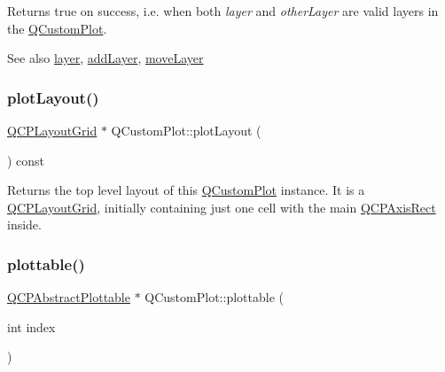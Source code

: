Returns true on success, i.\+e. when both {\itshape layer} and {\itshape other\+Layer} are valid layers in the \hyperlink{class_q_custom_plot}{Q\+Custom\+Plot}.

\begin{DoxySeeAlso}{See also}
\hyperlink{class_q_custom_plot_a0a96244e7773b242ef23c32b7bdfb159}{layer}, \hyperlink{class_q_custom_plot_ad5255393df078448bb6ac83fa5db5f52}{add\+Layer}, \hyperlink{class_q_custom_plot_ae896140beff19424e9e9e02d6e331104}{move\+Layer} 
\end{DoxySeeAlso}
\mbox{\label{class_q_custom_plot_af1a1f1f571237deb7c2bd34a5e9f018f}} 
\subsubsection{\texorpdfstring{plot\+Layout()}{plotLayout()}}
{\footnotesize\ttfamily \hyperlink{class_q_c_p_layout_grid}{Q\+C\+P\+Layout\+Grid} $\ast$ Q\+Custom\+Plot\+::plot\+Layout (\begin{DoxyParamCaption}{ }\end{DoxyParamCaption}) const\hspace{0.3cm}{\ttfamily [inline]}}

Returns the top level layout of this \hyperlink{class_q_custom_plot}{Q\+Custom\+Plot} instance. It is a \hyperlink{class_q_c_p_layout_grid}{Q\+C\+P\+Layout\+Grid}, initially containing just one cell with the main \hyperlink{class_q_c_p_axis_rect}{Q\+C\+P\+Axis\+Rect} inside. \mbox{\label{class_q_custom_plot_a32de81ff53e263e785b83b52ecd99d6f}} 
\subsubsection{\texorpdfstring{plottable()}{plottable()}\hspace{0.1cm}{\footnotesize\ttfamily [1/2]}}
{\footnotesize\ttfamily \hyperlink{class_q_c_p_abstract_plottable}{Q\+C\+P\+Abstract\+Plottable} $\ast$ Q\+Custom\+Plot\+::plottable (\begin{DoxyParamCaption}\item[{int}]{index }\end{DoxyParamCaption})}

